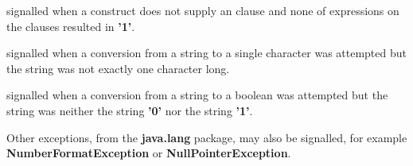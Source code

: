\begin{description}
 signalled when a  construct does not supply an
 clause and none of expressions on the 
clauses resulted in \textbf{'1'}.
\item[NotCharacterException]\label{refexpnce}
 signalled when a conversion from a string to a single character was
attempted but the string was not exactly one character long.
\item[NotLogicException]\label{refexpnle}
 signalled when a conversion from a string to a boolean was
attempted but the string was neither the string \textbf{'0'} nor the
string \textbf{'1'}.
\end{description}
 
Other exceptions, from the \textbf{java.lang} package, may also be
signalled, for example \textbf{NumberFormatException}
or \textbf{NullPointerException}.
